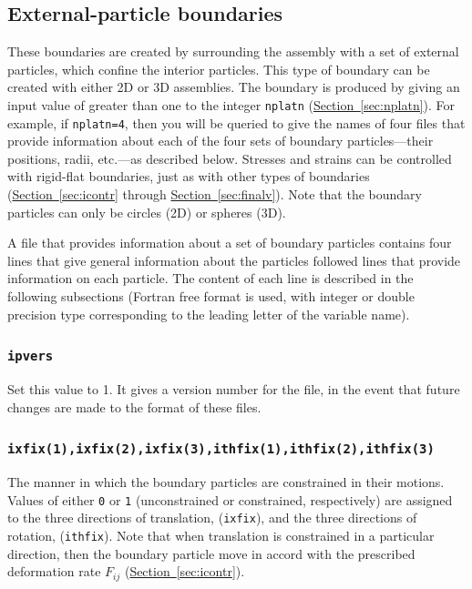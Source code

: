 \documentclass[letterpaper,11pt]{article}
\begin{document}
\subsection{External-particle boundaries}\label{sec:ExternalParticles}
These boundaries are created by surrounding the assembly with
a set of external particles, which confine the interior particles.
This type of boundary can be created with either 2D or 3D assemblies.
The boundary is produced by giving an input value of greater than one
to the integer \texttt{nplatn}
(\hyperref[sec:nplatn]{Section~\ref*{sec:nplatn}}).
For example, if \texttt{nplatn=4}, then you will be queried to
give the names of four files that provide information about
each of the four sets of
boundary particles---their positions, radii, etc.---as described below.
Stresses and strains can be controlled with rigid-flat boundaries,
just as with other types of boundaries
(\hyperref[sec:icontr]{Section~\ref*{sec:icontr}}
through \hyperref[sec:finalv]{Section~\ref*{sec:finalv}}).
Note that the boundary particles can only be circles (2D) or spheres (3D).
\par
A file that provides information about a set of boundary
particles contains four lines that give general information about
the particles followed lines that provide information on each particle.
The content of each line is described in the following
subsections (Fortran free format is used, with integer or double precision
type corresponding to the leading letter of the variable name).
%
\subsubsection[\texttt{ipvers}]{\texttt{ipvers}}%
\label{sec:pb1}
Set this value to 1.  It gives a version number for the file, in the
event that future changes are made to the format of these files.
%
%
\subsubsection[\texttt{ixfix(1)}]{\texttt{ixfix(1),ixfix(2),ixfix(3),ithfix(1),ithfix(2),ithfix(3)}}%
\label{sec:pb2}
The manner in which the boundary particles are constrained in their motions.
Values of either \texttt{0} or \texttt{1} (unconstrained or constrained,
respectively) are assigned to the three directions of translation,
(\texttt{ixfix}), and the three directions of rotation, (\texttt{ithfix}).
Note that when translation is constrained in a particular direction, then
the boundary particle move in accord with the prescribed
deformation rate $F_{ij}$
(\hyperref[sec:icontr]{Section~\ref*{sec:icontr}}).
%
\end{document}
